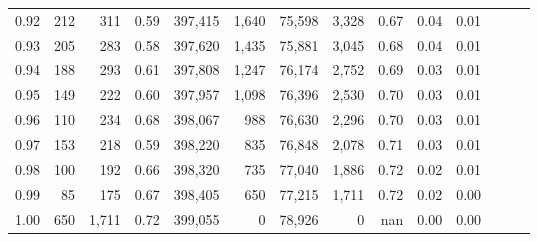 \begin{tabular}{rrrrrrrrrrrrrr}
0.92 &    212 &    311 &  0.59 &  397,415 &    1,640 &  75,598 &   3,328 &  0.67 &  0.04 &      0.01 \\
0.93 &    205 &    283 &  0.58 &  397,620 &    1,435 &  75,881 &   3,045 &  0.68 &  0.04 &      0.01 \\
0.94 &    188 &    293 &  0.61 &  397,808 &    1,247 &  76,174 &   2,752 &  0.69 &  0.03 &      0.01 \\
0.95 &    149 &    222 &  0.60 &  397,957 &    1,098 &  76,396 &   2,530 &  0.70 &  0.03 &      0.01 \\
0.96 &    110 &    234 &  0.68 &  398,067 &      988 &  76,630 &   2,296 &  0.70 &  0.03 &      0.01 \\
0.97 &    153 &    218 &  0.59 &  398,220 &      835 &  76,848 &   2,078 &  0.71 &  0.03 &      0.01 \\
0.98 &    100 &    192 &  0.66 &  398,320 &      735 &  77,040 &   1,886 &  0.72 &  0.02 &      0.01 \\
0.99 &     85 &    175 &  0.67 &  398,405 &      650 &  77,215 &   1,711 &  0.72 &  0.02 &      0.00 \\
1.00 &    650 &  1,711 &  0.72 &  399,055 &        0 &  78,926 &       0 &   nan &  0.00 &      0.00 \\
\bottomrule
\end{tabular}
